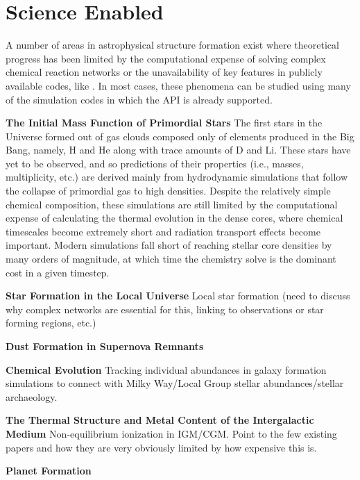 \section{Science Enabled}

A number of areas in astrophysical structure formation exist where
theoretical progress has been limited by the computational expense of
solving complex chemical reaction networks or the unavailability of
key features in publicly available codes, like \grackle{}.  In most
cases, these phenomena can be studied using many of the simulation
codes in which the \grackle{} API is already supported.

\noindent \textbf{The Initial Mass Function of Primordial Stars}
The first stars in the Universe formed out of gas clouds composed only
of elements produced in the Big Bang, namely, H and He along with trace
amounts of D and Li.  These stars have yet to be observed, and so
predictions of their properties (i.e., masses, multiplicity, etc.) are
derived mainly from hydrodynamic simulations that follow the collapse
of primordial gas to high densities.  Despite the relatively simple
chemical composition, these simulations are still limited by the
computational expense of calculating the thermal evolution in the
dense cores, where chemical timescales become extremely short and
radiation transport effects become important.  Modern simulations fall
short of reaching stellar core densities by many orders of magnitude,
at which time the chemistry solve is the dominant cost in a given
timestep.

\noindent \textbf{Star Formation in the Local Universe}
Local star formation (need to discuss why complex networks are
essential for this, linking to observations or star forming regions,
etc.)

\noindent \textbf{Dust Formation in Supernova Remnants}

\noindent \textbf{Chemical Evolution}
Tracking individual abundances in galaxy formation simulations to
connect with Milky Way/Local Group stellar abundances/stellar archaeology.

\noindent \textbf{The Thermal Structure and Metal Content of the
  Intergalactic Medium}
Non-equilibrium ionization in IGM/CGM. Point to the few existing
papers and how they are very obviously limited by how expensive this
is.

\noindent \textbf{Planet Formation}
